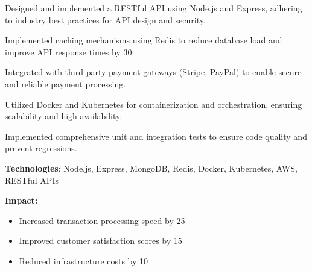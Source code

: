 \documentclass[]{deedy-resume-openfont}
\begin{document}
\begin{minipage}[t]{0.66\textwidth}
\vspace{\topsep} %
\begin{tightemize}
\item Designed and implemented a RESTful API using Node.js and Express, adhering to industry best practices for API design and security.
\item Implemented caching mechanisms using Redis to reduce database load and improve API response times by 30%
\item Integrated with third-party payment gateways (Stripe, PayPal) to enable secure and reliable payment processing.
\item Utilized Docker and Kubernetes for containerization and orchestration, ensuring scalability and high availability.
\item Implemented comprehensive unit and integration tests to ensure code quality and prevent regressions.
\item \textbf{Technologies}: Node.js, Express, MongoDB, Redis, Docker, Kubernetes, AWS, RESTful APIs
\item \textbf{Impact:}
    \begin{itemize}
        \item Increased transaction processing speed by 25%
        \item Improved customer satisfaction scores by 15%
        \item Reduced infrastructure costs by 10%
    \end{itemize}
\end{tightemize}
\sectionsep


\end{minipage}
\end{document}
